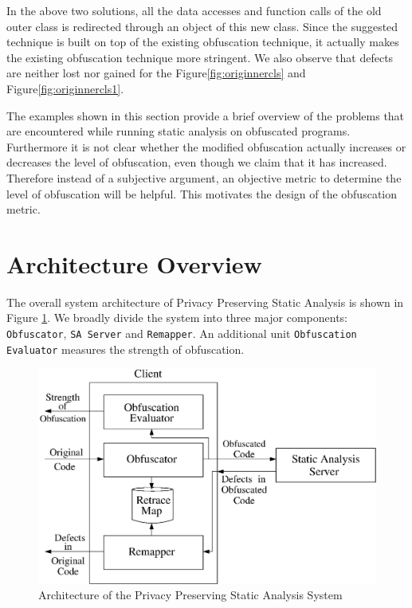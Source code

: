 \documentclass[twocolumn]{article}
\begin{document}
In the above two solutions, all the data accesses and function calls of the old outer class is redirected through an object of this new class. Since the suggested technique is built 
on top of the existing obfuscation technique, it actually makes the existing obfuscation technique more stringent. We also observe that defects are neither lost nor 
gained for the Figure\ref{fig:originnercls} and Figure\ref{fig:originnercls1}.

The examples shown in this section provide a brief overview of the problems that are encountered while running static analysis on obfuscated programs. Furthermore it is not clear 
whether the modified obfuscation actually increases or decreases the level of obfuscation, even though we claim that it has increased. Therefore instead of a subjective argument, 
an objective metric to determine the level of obfuscation will be helpful. This motivates the design of the obfuscation metric.
\section{Architecture Overview}
The overall system architecture of Privacy Preserving Static Analysis is shown in Figure \ref{fig:architecture}. We broadly divide the system into three major components: 
{\tt Obfuscator}, {\tt SA Server} and {\tt Remapper}. An additional unit {\tt Obfuscation Evaluator} measures the strength of obfuscation.

\begin{figure}[h]
 \centering
 \includegraphics[scale=0.4]{./architecture2.eps}
 \caption{Architecture of the Privacy Preserving Static Analysis System}
 \label{fig:architecture}
\end{figure}
\end{document}

